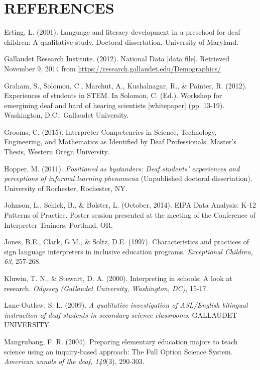 \documentclass[11.5pt]{sig-alternate} %
\begin{document}
\begin{large}
\end{large}
\clearpage
\section*{REFERENCES}\par 

\leftskip 0.25in
\parindent -0.25in 
Erting, L. (2001). Language and literacy development in a preschool for deaf children: A qualitative study. Doctoral dissertation, University of Maryland.

Gallaudet Research Institute. (2012). National Data [data file]. Retrieved November 9, 2014 from \url{https://research.gallaudet.edu/Demographics/}

Graham, S., Solomon, C., Marchut, A., Kushalnagar, R., \& Painter, R. (2012). Experiences of students in STEM. In Solomon, C. (Ed.). Workshop for emergining deaf and hard of hearing scientists [whitepaper] (pp. 13-19). Washington, D.C.: Gallaudet University.

Grooms, C. (2015). Interpreter Competencies in Science, Technology, Engineering, and Mathematics as Identified by Deaf Professionals. Master’s Thesis, Western Oregn University.

Hopper, M. (2011). \textit{Positioned as bystanders: Deaf students’ experiences and perceptions of informal learning phenomena} (Unpublished doctoral dissertation). University of Rochester, Rochester, NY.

Johnson, L., Schick, B., \& Bolster, L. (October, 2014). EIPA Data Analysis: K-12 Patterns of Practice. Poster session presented at the meeting of the Conference of Interpreter Trainers, Portland, OR.

Jones, B.E., Clark, G.M., \& Soltz, D.E. (1997). Characteristics and practices of sign language interpreters in inclusive education programs. \textit{Exceptional Children, 63}, 257-268.

Kluwin, T. N., \& Stewart, D. A. (2000). Interpreting in schools: A look at research. \textit{Odyssey (Gallaudet University, Washington, DC)}, 15-17.

Lane-Outlaw, S. L. (2009). \textit{A qualitative investigation of ASL/English bilingual instruction of deaf students in secondary science classrooms}. GALLAUDET UNIVERSITY.

Mangrubang, F. R. (2004). Preparing elementary education majors to teach science using an inquiry-based approach: The Full Option Science System. \textit{American annals of the deaf, 149}(3), 290-303.
\end{document}
